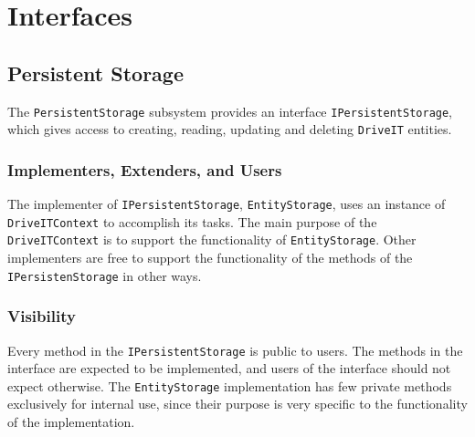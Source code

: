 \section{Interfaces}

\subsection{Persistent Storage}
The \texttt{PersistentStorage} subsystem provides an interface \texttt{IPersistentStorage}, which gives access to creating, reading, updating and deleting \texttt{DriveIT} entities. 

\subsubsection{Implementers, Extenders, and Users}
The implementer of \texttt{IPersistentStorage}, \texttt{EntityStorage}, uses an instance of \texttt{DriveITContext} to accomplish its tasks. The main purpose of the \texttt{DriveITContext} is to support the functionality of \texttt{EntityStorage}. Other implementers are free to support the functionality of the methods of the \texttt{IPersistenStorage} in other ways. 

\subsubsection{Visibility}
Every method in the \texttt{IPersistentStorage} is public to users. The methods in the interface are expected to be implemented, and users of the interface should not expect otherwise.
The \texttt{EntityStorage} implementation has few private methods exclusively for internal use, since their purpose is very specific to the functionality of the implementation.
